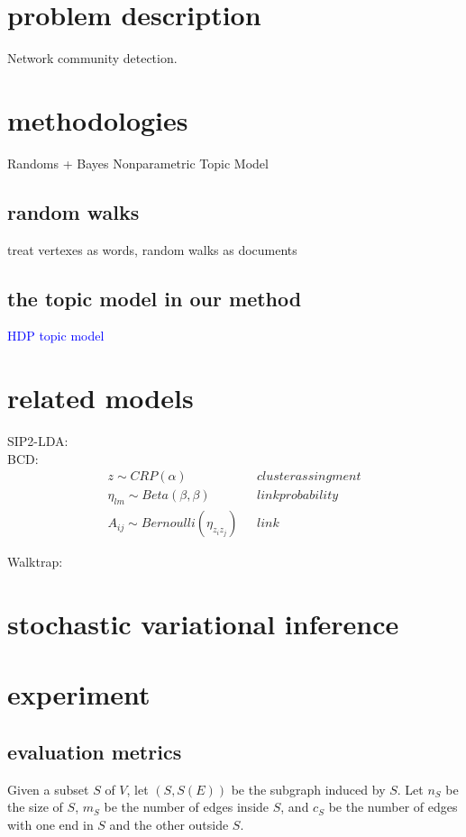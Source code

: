 \documentclass{article}
\begin{document}
\tableofcontents
\section{problem description}
Network community detection.

\section{methodologies}
Randoms + Bayes Nonparametric Topic Model

\subsection{random walks}
treat vertexes as words, random walks as documents

\subsection{the topic model in our method}
\textcolor{blue}{HDP topic model}

\section{related models}
SIP2-LDA:\\

BCD:
\begin{align*}
z\sim CRP(\alpha) & ~~~cluster assingment\\
\eta_{lm}\sim Beta(\beta, \beta) & ~~~link probability\\
A_{ij}\sim Bernoulli(\eta_{z_iz_j})& ~~~ link
\end{align*}

Walktrap:


\section{stochastic variational inference}

\section{experiment}
\subsection{evaluation metrics}
Given a subset $S$ of $V$, let $(S, S(E))$ be the subgraph induced by $S$. Let $n_S$ be the size of $S$, $m_S$ be the number of edges inside $S$, and $c_S$ be the number of edges with one end in $S$ and the other outside $S$.
\end{document}
